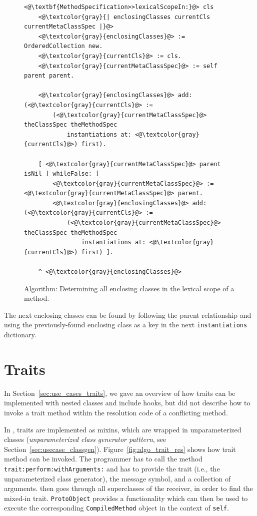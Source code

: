 \begin{figure}[!htp]
\begin{lstlisting}
<@\textbf{MethodSpecification>>lexicalScopeIn:}@> cls
    <@\textcolor{gray}{| enclosingClasses currentCls currentMetaClassSpec |}@>
    <@\textcolor{gray}{enclosingClasses}@> := OrderedCollection new.
    <@\textcolor{gray}{currentCls}@> := cls.
    <@\textcolor{gray}{currentMetaClassSpec}@> := self parent parent.

    <@\textcolor{gray}{enclosingClasses}@> add: (<@\textcolor{gray}{currentCls}@> := 
        (<@\textcolor{gray}{currentMetaClassSpec}@> theClassSpec theMethodSpec 
            instantiations at: <@\textcolor{gray}{currentCls}@>) first).

    [ <@\textcolor{gray}{currentMetaClassSpec}@> parent isNil ] whileFalse: [
        <@\textcolor{gray}{currentMetaClassSpec}@> := <@\textcolor{gray}{currentMetaClassSpec}@> parent.
        <@\textcolor{gray}{enclosingClasses}@> add: (<@\textcolor{gray}{currentCls}@> := 
            (<@\textcolor{gray}{currentMetaClassSpec}@> theClassSpec theMethodSpec 
                instantiations at: <@\textcolor{gray}{currentCls}@>) first) ].

    ^ <@\textcolor{gray}{enclosingClasses}@>
\end{lstlisting}
\caption[Algorithm: Determining the lexical scope of a method]{Algorithm: Determining all enclosing classes in the lexical scope of a method.}
\label{fig:app_det_lex_scope_algo}
\end{figure}

The next enclosing classes can be found by following the parent relationship and using the previously-found enclosing class as a key in the next \texttt{instantiations} dictionary.

\section{Traits}
\label{sec:app_traits}
In Section~\ref{sec:use_cases_traits}, we gave an overview of how traits can be implemented with nested classes and include hooks, but did not describe how to invoke a trait method within the resolution code of a conflicting method.

In \msname, traits are implemented as mixins, which are wrapped in unparameterized classes (\emph{unparameterized class generator patttern}, see Section~\ref{sec:usecase_classgen}). Figure~\ref{fig:algo_trait_res} shows how trait method can be invoked. The programmer has to call the method \texttt{trait:perform:withArguments:} and has to provide the trait (i.e., the unparameterized class generator), the message symbol, and a collection of arguments. \msname then goes through all superclasses of the receiver, in order to find the mixed-in trait. \texttt{ProtoObject} provides a functionality which can then be used to execute the corresponding \texttt{CompiledMethod} object in the context of \texttt{self}.

